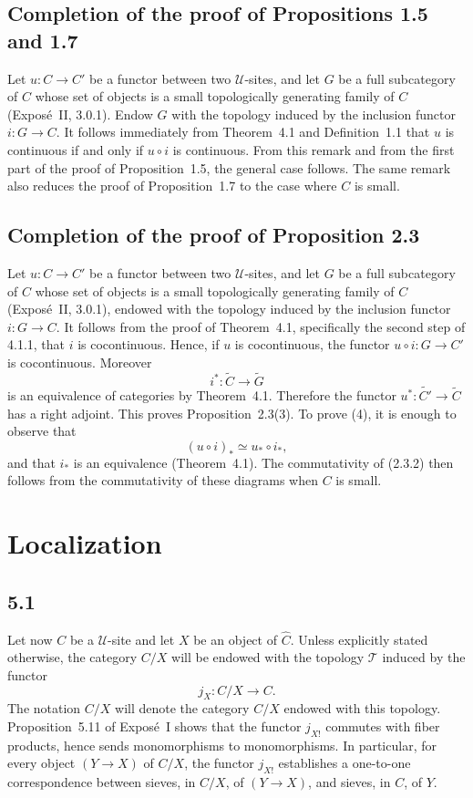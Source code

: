 \documentclass[11pt]{article}
\newcommand{\U}{\mathcal{U}}
\begin{document}
\subsection{Completion of the proof of Propositions 1.5 and 1.7}
Let \(u:C\to C'\) be a functor between two \(\U\)-sites, and let \(G\) be a full subcategory of \(C\) whose set of objects is a small topologically generating family of \(C\) (Expos\'e~II, 3.0.1). Endow \(G\) with the topology induced by the inclusion functor \(i:G\to C\). It follows immediately from Theorem~4.1 and Definition~1.1 that \(u\) is continuous if and only if \(u\circ i\) is continuous. From this remark and from the first part of the proof of Proposition~1.5, the general case follows. The same remark also reduces the proof of Proposition~1.7 to the case where \(C\) is small.

\subsection{Completion of the proof of Proposition 2.3}
Let \(u:C\to C'\) be a functor between two \(\U\)-sites, and let \(G\) be a full subcategory of \(C\) whose set of objects is a small topologically generating family of \(C\) (Expos\'e~II, 3.0.1), endowed with the topology induced by the inclusion functor \(i:G\to C\). It follows from the proof of Theorem~4.1, specifically the second step of 4.1.1, that \(i\) is cocontinuous. Hence, if \(u\) is cocontinuous, the functor \(u\circ i:G\to C'\) is cocontinuous. Moreover
\[
i^*:\widetilde C\longrightarrow\widetilde G
\]
is an equivalence of categories by Theorem~4.1. Therefore the functor \(u^*:\widetilde{C'}\to\widetilde C\) has a right adjoint. This proves Proposition~2.3(3). To prove (4), it is enough to observe that
\[
(u\circ i)_*\simeq u_*\circ i_*,
\]
and that \(i_*\) is an equivalence (Theorem~4.1). The commutativity of (2.3.2) then follows from the commutativity of these diagrams when \(C\) is small.

\section{Localization}

\subsection*{5.1}
Let now \(C\) be a \(\U\)-site and let \(X\) be an object of \(\widehat C\). Unless explicitly stated otherwise, the category \(C/X\) will be endowed with the topology \(\mathcal T\) induced by the functor
\[
j_X:C/X\longrightarrow C.
\]
The notation \(C/X\) will denote the category \(C/X\) endowed with this topology. Proposition~5.11 of Expos\'e~I shows that the functor \(j_{X!}\) commutes with fiber products, hence sends monomorphisms to monomorphisms. In particular, for every object \((Y\to X)\) of \(C/X\), the functor \(j_{X!}\) establishes a one-to-one correspondence between sieves, in \(C/X\), of \((Y\to X)\), and sieves, in \(C\), of \(Y\).
\end{document}
